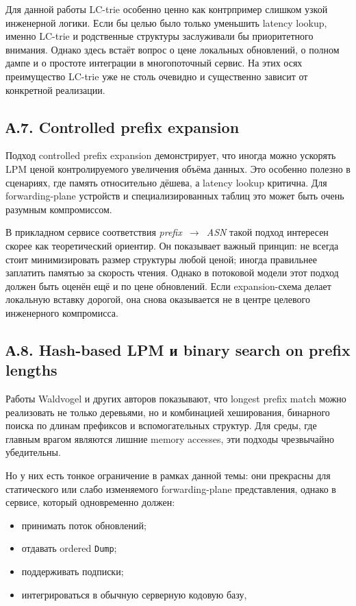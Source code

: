 Для данной работы LC-trie особенно ценно как контрпример слишком
узкой инженерной логики. Если бы целью было только уменьшить latency
lookup, именно LC-trie и родственные структуры заслуживали бы
приоритетного внимания. Однако здесь встаёт вопрос о цене локальных
обновлений, о полном дампе и о простоте интеграции в многопоточный
сервис. На этих осях преимущество LC-trie уже не столь очевидно и
существенно зависит от конкретной реализации.

\subsection*{А.7. Controlled prefix expansion}

Подход controlled prefix expansion \cite{srinivasan1999prefixexpansion}
демонстрирует, что иногда можно ускорять LPM ценой контролируемого
увеличения объёма данных. Это особенно полезно в сценариях, где
память относительно дёшева, а latency lookup критична. Для
forwarding-plane устройств и специализированных таблиц это может
быть очень разумным компромиссом.

В прикладном сервисе соответствия \textit{prefix~$\rightarrow$~ASN}
такой подход интересен скорее как теоретический ориентир. Он
показывает важный принцип: не всегда стоит минимизировать размер
структуры любой ценой; иногда правильнее заплатить памятью за
скорость чтения. Однако в потоковой модели этот подход должен быть
оценён ещё и по цене обновлений. Если expansion-схема делает
локальную вставку дорогой, она снова оказывается не в центре
целевого инженерного компромисса.

\subsection*{А.8. Hash-based LPM и binary search on prefix lengths}

Работы Waldvogel и других авторов \cite{waldvogel1997scalable,
gupta1998hardware} показывают, что longest prefix match можно
реализовать не только деревьями, но и комбинацией хеширования,
бинарного поиска по длинам префиксов и вспомогательных структур. Для
среды, где главным врагом являются лишние memory accesses, эти
подходы чрезвычайно убедительны.

Но у них есть тонкое ограничение в рамках данной темы: они
прекрасны для статического или слабо изменяемого forwarding-plane
представления, однако в сервисе, который одновременно должен:

\begin{itemize}
\item принимать поток обновлений;
\item отдавать ordered \texttt{Dump};
\item поддерживать подписки;
\item интегрироваться в обычную серверную кодовую базу,
\end{itemize}

